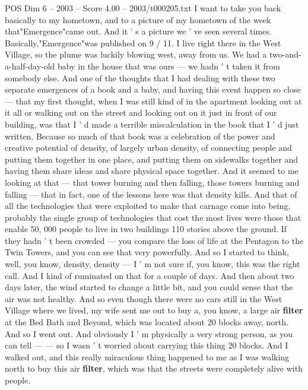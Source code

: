 \begin{textsample}{POS Dim 6 – 2003 – Score 4.00 – 2003/t000205.txt}  \label{ex:f6_pos_020}
I want to take you back basically to my hometown, and to a picture of my hometown of the week that"Emergence"came out.
And it ' s a picture we ' ve seen several times.
Basically,"Emergence"was published on 9 / 11.
I live right there in the West Village, so the plume was luckily blowing west, away from us.
We had a two-and-a-half-day-old baby in the house that was ours — we hadn ' t taken it from somebody else.
And one of the thoughts that I had dealing with these two separate emergences of a book and a baby, and having this event happen so close — that my first thought, when I was still kind of in the apartment looking out at it all or walking out on the street and looking out on it just in front of our building, was that I ' d made a terrible miscalculation in the book that I ' d just written.
Because so much of that book was a celebration of the power and creative potential of density, of largely urban density, of connecting people and putting them together in one place, and putting them on sidewalks together and having them share ideas and share physical space together.
And it seemed to me looking at that — that tower burning and then falling, those towers burning and falling — that in fact, one of the lessons here was that density kills.
And that of all the technologies that were exploited to make that carnage come into being, probably the single group of technologies that cost the most lives were those that enable 50, 000 people to live in two buildings 110 stories above the ground.
If they hadn ' t been crowded — you compare the loss of life at the Pentagon to the Twin Towers, and you can see that very powerfully.
And so I started to think, well, you know, density, density — I ' m not sure if, you know, this was the right call.
And I kind of ruminated on that for a couple of days.
And then about two days later, the wind started to change a little bit, and you could sense that the air was not healthy.
And so even though there were no cars still in the West Village where we lived, my wife sent me out to buy a, you know, a large air \textbf{filter} at the Bed Bath and Beyond, which was located about 20 blocks away, north.
And so I went out.
And obviously I ' m physically a very strong person, as you can tell — — so I wasn ' t worried about carrying this thing 20 blocks.
And I walked out, and this really miraculous thing happened to me as I was walking north to buy this air \textbf{filter}, which was that the streets were completely alive with people.

\end{textsample}
